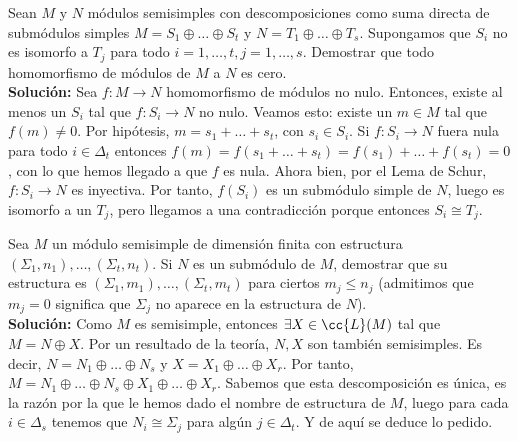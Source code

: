 \begin{ejercicio}
    Sean $M$ y $N$ módulos semisimples con descomposiciones como suma directa de submódulos simples $M = S_1\oplus \ldots\oplus S_t$ y $N=T_1\oplus \ldots\oplus T_s$. Supongamos que $S_i$ no es isomorfo a $T_j$ para todo $i = 1,\ldots,t,j=1,\ldots,s$. Demostrar que todo homomorfismo de módulos de $M$ a $N$ es cero. \\
    
    \noindent
    \textbf{Solución:}
Sea $f:M \to N$ homomorfismo de módulos no nulo. Entonces, existe al menos un $S_i $ tal que $f:S_i \to N$ no nulo. Veamos esto: existe un $m\in M$ tal que $f(m) \neq 0$. Por hipótesis,  $m = s_1 + \ldots + s_t$, con $s_i \in S_i $. Si $f:S_i \to N$ fuera nula para todo $i \in \Delta_t$ entonces $f(m)= f(s_1 + \ldots + s_t) = f(s_1) +\ldots+f(s_t) = 0$, con lo que hemos llegado a que $f$ es nula. Ahora bien, por el Lema de Schur, $f:S_i \to N$ es inyectiva. Por tanto, $f(S_i)$ es un submódulo simple de $N$, luego es isomorfo a un $T_j$, pero llegamos a una contradicción porque entonces $S_i \cong T_j$.
\end{ejercicio}

\begin{ejercicio}\label{ej:39}
    Sea $M$ un módulo semisimple de dimensión finita con estructura $(\Sigma_1,n_1), \ldots, (\Sigma_t,n_t)$. Si $N$ es un submódulo de $M$, demostrar que su estructura es $(\Sigma_1,m_1), \ldots, (\Sigma_t,m_t)$ para ciertos $m_j\leq n_j$ (admitimos que $m_j=0$ significa que $\Sigma_j$ no aparece en la estructura de $N$). \\
    
    \noindent
    \textbf{Solución:}
    Como $M$ es semisimple, entonces $\exists X \in \cc{L}(M)$ tal que $M = N \oplus X$. Por un resultado de la teoría, $N,X$ son también semisimples. Es decir, $N = N_1 \oplus \ldots \oplus N_s$ y $X = X_1 \oplus \ldots\oplus X_r$. Por tanto, $M = N_1 \oplus \ldots \oplus N_s \oplus X_1 \oplus \ldots\oplus X_r$. Sabemos que esta descomposición es única, es la razón por la que le hemos dado el nombre de estructura de $M$, luego para cada $i \in \Delta_s$ tenemos que $N_i \cong \Sigma_j$ para algún $j \in \Delta_t$. Y de aquí se deduce lo pedido.
\end{ejercicio}

